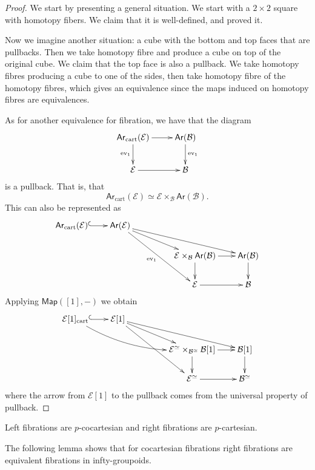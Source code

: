 \begin{proof}
We start by presenting a general situation.
We start with a $2\times 2$ square with
homotopy
fibers. We claim that it is well-defined, and
proved it.

Now we imagine another situation:
a cube with the bottom and top faces that are
pullbacks.
Then we take homotopy fibre and produce a
cube on top of
the original cube. We claim that the top face
is also a pullback. We take homotopy fibres
producing
a cube to one of the sides, then take
homotopy
fibre of the homotopy fibres,
which gives an equivalence since the maps
induced
on homotopy fibres are equivalences.

As for another equivalence for fibration,
we have that the diagram
$$
\xymatrix{
\mathsf{Ar}_{\text{cart}}(\mathcal{E})\ar[r]
\ar[d]_{\text{ev}_1}&
\mathsf{Ar}(\mathcal{B})\ar[d]^{\text{ev}_1}
\\
\mathcal{E}\ar[r]&\mathcal{B}
}
$$
is a pullback. That is, that
$$
\mathsf{Ar}_{\text{cart}}(\mathcal{E})
\simeq
\mathcal{E}\times_{\mathcal{B}}\mathsf{Ar}
(\mathcal{B}).
$$
This can also be represented as
$$
\xymatrix@C=2em@R=2em{
\mathsf{Ar}_{\text{cart}}(\mathcal{E})
\ar@{^{(}->}[r]
&\mathsf{Ar}(\mathcal{E}) \ar[rrrd] \ar[rrd]
\ar[rrdd]_{\text{ev}_1} & & \\
& & &
\mathcal{E}\times_{\mathcal{B}}\mathsf{Ar}
(\mathcal{B})
\ar[d] \ar[r]
& \mathsf{Ar}(\mathcal{B}) \ar[d] \\
& & & \mathcal{E} \ar[r] & \mathcal{B}
}
$$
Applying $\mathsf{Map}([1],-)$ we obtain
$$
\xymatrix@C=2em@R=2em{
\mathcal{E}[1]_{\text{cart}}\ar@/_{1pc}/
[rrrd]\ar@{^{(}->}[r]
&\mathcal{E}[1] \ar[rrrd] \ar[rrd] \ar[rrdd]
& & \\
& & &
\mathcal{E}^{\simeq}\times_{\mathcal{B}
^{\simeq}}\mathcal{B}[1]
 \ar[d] \ar[r]
& \mathcal{B}[1] \ar[d] \\
& & & \mathcal{E}^{\simeq} \ar[r] &
\mathcal{B}^{\simeq}
}
$$
where the arrow from $\mathcal{E}[1]$ to the
pullback
comes from the universal property of
pullback.


\end{proof}

\begin{proposition}
\label{proposition-left-fibra-cocar}
Left fibrations are $p$-cocartesian and right
fibrations are $p$-cartesian.
\end{proposition}

\noindent
The following lemma shows that for
cocartesian fibrations
right fibrations are equivalent
fibrations in infty-groupoids.

